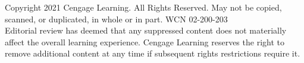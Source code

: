 \vfill
\noindent
\parbox{\textwidth}{%
    \centering\fontsize{6.5pt}{8pt}\selectfont\color{stewartgray}%
    Copyright 2021 Cengage Learning. All Rights Reserved. May not be copied, scanned, or duplicated, in whole or in part. WCN 02-200-203\\
    Editorial review has deemed that any suppressed content does not materially affect the overall learning experience. Cengage Learning reserves the right to remove additional content at any time if subsequent rights restrictions require it.%
}
